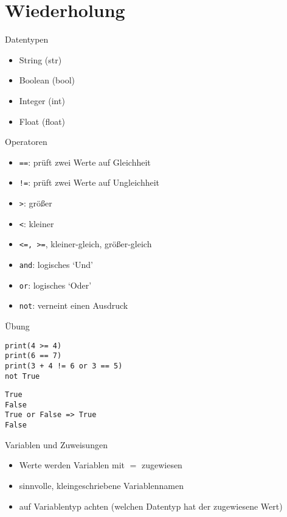 \section{Wiederholung}

\begin{frame}[fragile]{Datentypen}
	\begin{itemize}
		\item String (str)
		\item Boolean (bool)
		\item Integer (int)
		\item Float (float)
	\end{itemize}
\end{frame}

\begin{frame}[fragile]{Operatoren}
	\begin{itemize}
		\item \texttt{==}: prüft zwei Werte auf Gleichheit
		\item \texttt{!=}: prüft zwei Werte auf Ungleichheit
		\item \texttt{>}: größer
		\item \texttt{<}: kleiner 
		\item \texttt{<=, >=}, kleiner-gleich, größer-gleich
		\item \texttt{and}: logisches `Und'
		\item \texttt{or}: logisches `Oder'
		\item \texttt{not}: verneint einen Ausdruck
	\end{itemize}
\end{frame}


\begin{frame}[fragile]{Übung}
\begin{lstlisting} 
print(4 >= 4) 
print(6 == 7)
print(3 + 4 != 6 or 3 == 5)
not True
\end{lstlisting}
\pause{}
\begin{lstlisting} 
True
False
True or False => True
False
\end{lstlisting}

\end{frame}

\begin{frame}[fragile]{Variablen und Zuweisungen}
	\begin{itemize}
		\item Werte werden Variablen mit $=$ zugewiesen
		\item sinnvolle, kleingeschriebene Variablennamen
		\item auf Variablentyp achten (welchen Datentyp hat der zugewiesene Wert)
	\end{itemize}
\end{frame}

